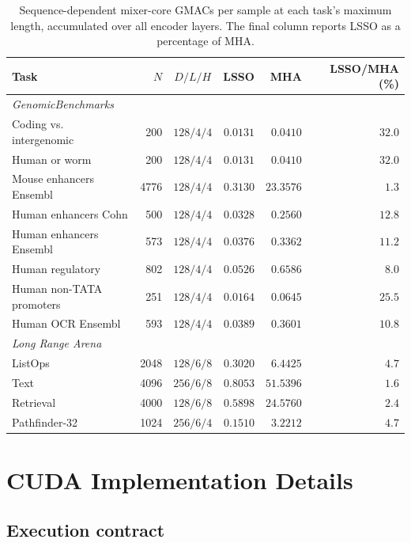 \documentclass[10pt]{article}
\begin{document}
\begin{table}[H]
\centering
\footnotesize
\setlength{\tabcolsep}{4.5pt}
\caption{Sequence-dependent mixer-core GMACs per sample at each task's maximum
length, accumulated over all encoder layers.  The final column reports LSSO as
a percentage of MHA.}
\label{tab:mixer-macs}
\begin{tabular}{lrcrrr}
\toprule
Task & $N$ & $D/L/H$ & LSSO & MHA & LSSO/MHA (\%) \\
\midrule
\multicolumn{6}{l}{\emph{GenomicBenchmarks}} \\
Coding vs. intergenomic & 200  & $128/4/4$ & $0.0131$ & $0.0410$ & $32.0$ \\
Human or worm           & 200  & $128/4/4$ & $0.0131$ & $0.0410$ & $32.0$ \\
Mouse enhancers Ensembl & 4776 & $128/4/4$ & $0.3130$ & $23.3576$ & $1.3$ \\
Human enhancers Cohn    & 500  & $128/4/4$ & $0.0328$ & $0.2560$ & $12.8$ \\
Human enhancers Ensembl & 573  & $128/4/4$ & $0.0376$ & $0.3362$ & $11.2$ \\
Human regulatory        & 802  & $128/4/4$ & $0.0526$ & $0.6586$ & $8.0$ \\
Human non-TATA promoters & 251 & $128/4/4$ & $0.0164$ & $0.0645$ & $25.5$ \\
Human OCR Ensembl       & 593  & $128/4/4$ & $0.0389$ & $0.3601$ & $10.8$ \\
\midrule
\multicolumn{6}{l}{\emph{Long Range Arena}} \\
ListOps                 & 2048 & $128/6/8$ & $0.3020$ & $6.4425$  & $4.7$ \\
Text                    & 4096 & $256/6/8$ & $0.8053$ & $51.5396$ & $1.6$ \\
Retrieval               & 4000 & $128/6/8$ & $0.5898$ & $24.5760$ & $2.4$ \\
Pathfinder-32           & 1024 & $256/6/4$ & $0.1510$ & $3.2212$  & $4.7$ \\
\bottomrule
\end{tabular}
\end{table}

\section{CUDA Implementation Details}
\label{app:cuda}

\subsection{Execution contract}
\end{document}
